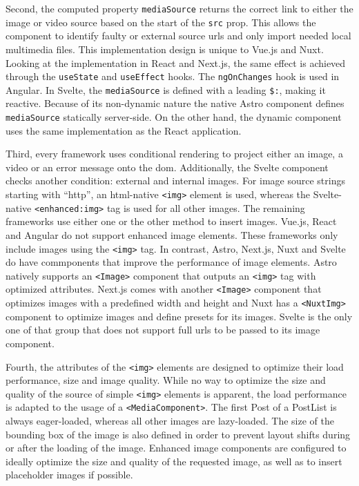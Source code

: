 \documentclass[a4paper, 12pt]{article}
\begin{document}
Second, the computed property \verb|mediaSource| returns the correct link to either the image or video source based on the start of the \verb|src| prop.
This allows the component to identify faulty or external source \acrshort{url}s and only import needed local multimedia files.
This implementation design is unique to Vue.js and Nuxt.
Looking at the implementation in React and Next.js, the same effect is achieved through the \verb|useState| and \verb|useEffect| hooks.
The \verb|ngOnChanges| hook is used in Angular.
In Svelte, the \verb|mediaSource| is defined with a leading \verb|$:|, making it reactive. Because of its non-dynamic nature the native Astro component defines \verb|mediaSource| statically server-side.
On the other hand, the dynamic component uses the same implementation as the React application.

Third, every framework uses conditional rendering to project either an image, a video or an error message onto the \acrshort{dom}.
Additionally, the Svelte component checks another condition: external and internal images.
For image source strings starting with \enquote{http}, an \acrshort{html}-native \verb|<img>| element is used, whereas the Svelte-native \verb|<enhanced:img>| tag is used for all other images.
The remaining frameworks use either one or the other method to insert images.
Vue.js, React and Angular do not support enhanced image elements.
These frameworks only include images using the \verb|<img>| tag.
In contrast, Astro, Next.js, Nuxt and Svelte do have commponents that improve the performance of image elements.
Astro natively supports an \verb|<Image>| component that outputs an \verb|<img>| tag with optimized attributes.
Next.js comes with another \verb|<Image>| component that optimizes images with a predefined width and height and Nuxt has a \verb|<NuxtImg>| component to optimize images and define presets for its images.
Svelte is the only one of that group that does not support full \acrshort{url}s to be passed to its image component.

Fourth, the attributes of the \verb|<img>| elements are designed to optimize their load performance, size and image quality.
While no way to optimize the size and quality of the source of simple \verb|<img>| elements is apparent, the load performance is adapted to the usage of a \verb|<MediaComponent>|.
The first Post of a PostList is always eager-loaded, whereas all other images are lazy-loaded.
The size of the bounding box of the image is also defined in order to prevent layout shifts during or after the loading of the image.
Enhanced image components are configured to ideally optimize the size and quality of the requested image, as well as to insert placeholder images if possible.
\end{document}
